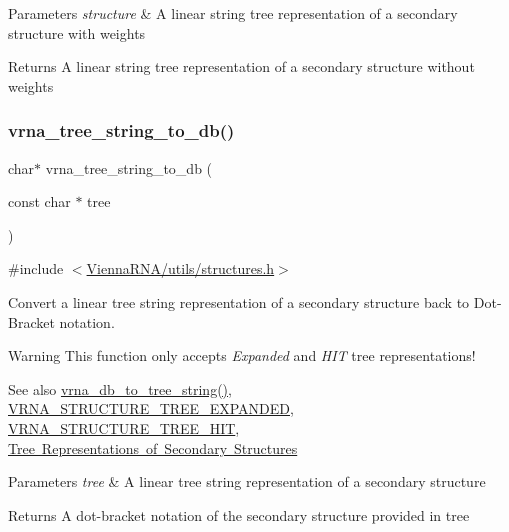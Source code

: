 \begin{DoxyParams}{Parameters}
{\em structure} & A linear string tree representation of a secondary structure with weights \\
\hline
\end{DoxyParams}
\begin{DoxyReturn}{Returns}
A linear string tree representation of a secondary structure without weights 
\end{DoxyReturn}
\mbox{\label{group__struct__utils__tree_ga99d280319a7fd3f87e9f0d8c44520774}} 
\subsubsection{\texorpdfstring{vrna\_tree\_string\_to\_db()}{vrna\_tree\_string\_to\_db()}}
{\footnotesize\ttfamily char$\ast$ vrna\+\_\+tree\+\_\+string\+\_\+to\+\_\+db (\begin{DoxyParamCaption}\item[{const char $\ast$}]{tree }\end{DoxyParamCaption})}



{\ttfamily \#include $<$\mbox{\hyperlink{utils_2structures_8h}{Vienna\+R\+N\+A/utils/structures.\+h}}$>$}



Convert a linear tree string representation of a secondary structure back to Dot-\/\+Bracket notation. 

\begin{DoxyWarning}{Warning}
This function only accepts {\itshape Expanded} and {\itshape H\+IT} tree representations!
\end{DoxyWarning}
\begin{DoxySeeAlso}{See also}
\mbox{\hyperlink{group__struct__utils__tree_ga56551ab7da64933a7230d29430f40cfe}{vrna\+\_\+db\+\_\+to\+\_\+tree\+\_\+string()}}, \mbox{\hyperlink{group__struct__utils__tree_gab3b65489d1322da65d3a3e53242307ef}{V\+R\+N\+A\+\_\+\+S\+T\+R\+U\+C\+T\+U\+R\+E\+\_\+\+T\+R\+E\+E\+\_\+\+E\+X\+P\+A\+N\+D\+ED}}, \mbox{\hyperlink{group__struct__utils__tree_ga3ad5609bc93ef20034c3ab989365c1f0}{V\+R\+N\+A\+\_\+\+S\+T\+R\+U\+C\+T\+U\+R\+E\+\_\+\+T\+R\+E\+E\+\_\+\+H\+IT}}, \mbox{\hyperlink{rna_structure_notations_sec_structure_representations_tree}{Tree Representations of Secondary Structures}}
\end{DoxySeeAlso}

\begin{DoxyParams}{Parameters}
{\em tree} & A linear tree string representation of a secondary structure \\
\hline
\end{DoxyParams}
\begin{DoxyReturn}{Returns}
A dot-\/bracket notation of the secondary structure provided in {\ttfamily tree} 
\end{DoxyReturn}
